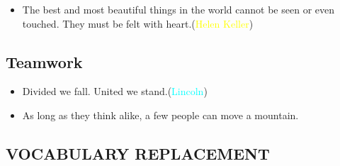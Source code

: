 \documentclass{article}
\begin{document}
\begin{itemize}
\item The best and most beautiful things in the world cannot be seen or even touched. They
  must be felt with heart.(\textcolor{yellow}{Helen Keller})
\end{itemize}

\subsection{Teamwork}
\label{sec:teamwork}

\begin{itemize}
\item Divided we fall. United we stand.(\textcolor{cyan}{Lincoln})
\item As long as they think alike, a few people can move a mountain.
\end{itemize}


\begin{center}
  \section{VOCABULARY REPLACEMENT}
\end{center}
\end{document}
